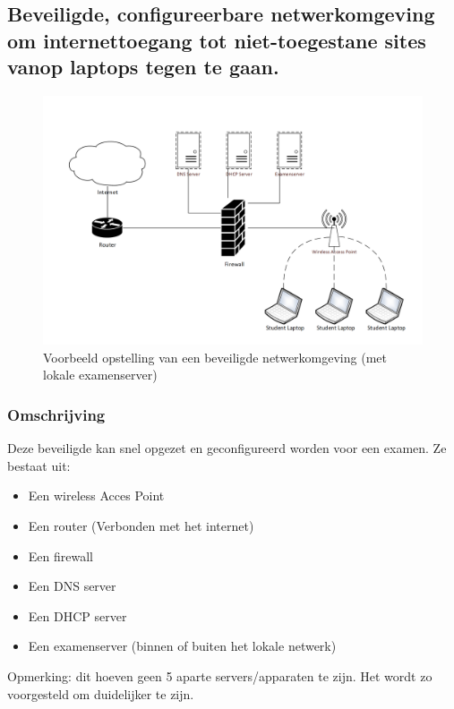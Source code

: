 	
	
\newpage

\subsection{Beveiligde, configureerbare netwerkomgeving om internettoegang tot niet-toegestane sites vanop laptops tegen te gaan.	}

	\begin{figure}
	\includegraphics[width=\linewidth]{img/OpstellingNWOMG}
	\caption{Voorbeeld opstelling van een beveiligde netwerkomgeving (met lokale examenserver)}
	\label{fig:Omgeving1}
\end{figure}

\subsubsection{Omschrijving}
Deze beveiligde kan snel opgezet en geconfigureerd worden voor een examen. Ze bestaat uit:
\begin{itemize}
\item Een wireless Acces Point
\item Een router (Verbonden met het internet)
\item Een firewall
\item Een DNS server
\item Een DHCP server
\item Een examenserver (binnen of buiten het lokale netwerk)

\end{itemize}
Opmerking: dit hoeven geen 5 aparte servers/apparaten te zijn. Het wordt zo voorgesteld om duidelijker te zijn.

